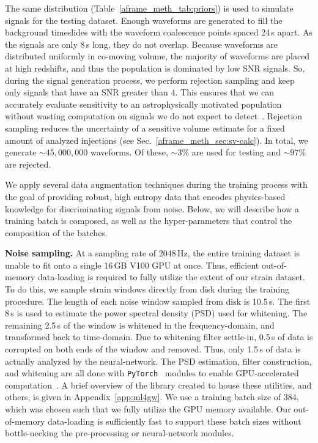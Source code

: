 \begin{refsection}
The same distribution (Table~\ref{aframe_meth_tab:priors}) is used to simulate signals for the testing dataset. 
Enough waveforms are generated to fill the background timeslides with the waveform coalescence points spaced 24\,s apart. 
As the signals are only 8\,s long, they do not overlap. 
Because waveforms are distributed uniformly in co-moving volume, the majority of waveforms are placed at high redshifts, and thus the population is dominated by low SNR signals. 
So, during the signal generation process, we perform rejection sampling and keep only signals that have an SNR greater than 4. 
This ensures that we can accurately evaluate sensitivity to an astrophysically motivated population without wasting computation on signals we do not expect to detect~\cite{ligo_scientific_collaboration_and_virgo_2023_7890437}. 
Rejection sampling reduces the uncertainty of a sensitive volume estimate for a fixed amount of analyzed injections (see Sec.~\ref{aframe_meth_sec:sv-calc}). 
In total, we generate $\sim 45,000,000$ waveforms. 
Of these, $\sim3\%$ are used for testing and $\sim97\%$ are rejected. 

We apply several data augmentation techniques during the training process with the goal of providing robust, high entropy data that encodes physics-based knowledge for discriminating signals from noise. 
Below, we will describe how a training batch is composed, as well as the hyper-parameters that control the composition of the batches. 

\textbf{Noise sampling.} \label{aframe_meth_sec:noise-sampling}
At a sampling rate of 2048\,Hz, the entire training dataset is unable to fit onto a single 16\,GB V100 GPU at once. 
Thus, efficient out-of-memory data-loading is required to fully utilize the extent of our strain dataset. 
To do this, we sample strain windows directly from disk during the training procedure. 
The length of each noise window sampled from disk is 10.5\,s. 
The first 8\,s is used to estimate the power spectral density (PSD) used for whitening. 
The remaining 2.5\,s of the window is whitened in the frequency-domain, and transformed back to time-domain. 
Due to whitening filter settle-in, 0.5\,s of data is corrupted on both ends of the window and removed. 
Thus, only 1.5\,s of data is actually analyzed by the neural-network. 
The PSD estimation, filter construction, and whitening are all done with \texttt{PyTorch}~\cite{10.5555/3454287.3455008} modules to enable GPU-accelerated computation~\cite{nousi2022deep}.
A brief overview of the library created to house these utilities, and others, is given in Appendix~\ref{app:ml4gw}.
We use a training batch size of 384, which was chosen such that we fully utilize the GPU memory available. 
Our out-of-memory data-loading is sufficiently fast to support these batch sizes without bottle-necking the pre-processing or neural-network modules.


\end{refsection}
